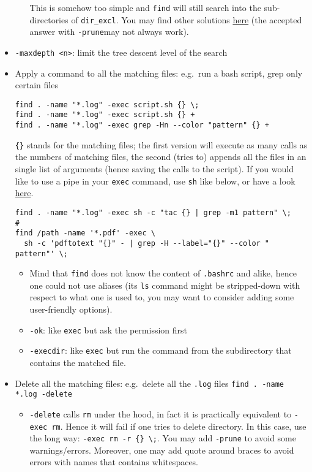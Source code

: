 \documentclass[a4paper,12pt,%
              final%
              ]{article}
\begin{document}
\begin{itemize}
\begin{itemize}
        This is somehow too simple and \texttt{find} will still search into the sub-directories of \verb|dir_excl|. You may find other solutions \href{https://stackoverflow.com/questions/4210042/how-to-exclude-a-directory-in-find-command}{here} (the accepted answer with \verb|-prune|may not always work).
    \end{itemize}
  \item \verb|-maxdepth <n>|: limit the tree descent level of the search
  \item Apply a command to all the matching files: e.g.~run a bash script, grep only certain files
\begin{verbatim}
find . -name "*.log" -exec script.sh {} \;
find . -name "*.log" -exec script.sh {} +
find . -name "*.log" -exec grep -Hn --color "pattern" {} +
\end{verbatim}
    \verb|{}| stands for the matching files; the first version will execute as many calls as the numbers of matching files, the second (tries to) appends all the files in an single list of arguments (hence saving the calls to the script). If you would like to use a pipe in your \texttt{exec} command, use \texttt{sh} like below, or have a look \href{https://stackoverflow.com/questions/307015/how-do-i-include-a-pipe-in-my-linux-find-exec-command}{here}.
\begin{verbatim}
find . -name "*.log" -exec sh -c "tac {} | grep -m1 pattern" \;
#
find /path -name '*.pdf' -exec \
  sh -c 'pdftotext "{}" - | grep -H --label="{}" --color " pattern"' \;
\end{verbatim}
  \begin{itemize}
    \item Mind that \texttt{find} does not know the content of \texttt{.bashrc} and alike, hence one could not use aliases (its \texttt{ls} command might be stripped-down with respect to what one is used to, you may want to consider adding some user-friendly options).
  \end{itemize}
  \begin{itemize}
    \item \verb|-ok|: like \texttt{exec} but ask the permission first
    \item \verb|-execdir|: like \texttt{exec} but run the command from the subdirectory that contains the matched file.
  \end{itemize}
  \item Delete all the matching files: e.g.~delete all the \texttt{.log} files \texttt{find . -name *.log -delete}
    \begin{itemize}
      \item \texttt{-delete} calls \texttt{rm} under the hood, in fact it is practically equivalent to \texttt{-exec rm}. Hence it will fail if one tries to delete directory. In this case, use the long way: \verb|-exec rm -r {} \;|. You may add \verb|-prune| to avoid some warnings/errors. Moreover, one may add quote around braces to avoid errors with names that contains whitespaces.
    \end{itemize}
\end{itemize}
\end{document}
